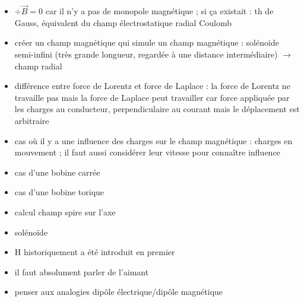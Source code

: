 \begin{remarques} \begin{itemize} 
\item $\div \vec{B} = 0$ car il n'y a pas de monopole magnétique ; si ça existait : th de Gauss, équivalent du champ électrostatique radial Coulomb
\item créer un champ magnétique qui simule un champ magnétique : solénoide semi-infini (très grande longueur, regardée à une distance intermédiaire) $\rightarrow$ champ radial
\item différence entre force de Lorentz et force de Laplace : la force de Lorentz ne travaille pas mais la force de Laplace peut travailler car force appliquée par les charges au conducteur, perpendiculaire au courant mais le déplacement est arbitraire   
\item cas où il y a une influence des charges sur le champ magnétique : charges en mouvement ; il faut aussi considérer leur vitesse pour connaître influence
\item cas d'une bobine carrée
\item cas d'une bobine torique
\item calcul champ spire sur l'axe
\item solénoïde
\item H historiquement a été introduit en premier
\item il faut absolument parler de l'aimant
\item penser aux analogies dipôle électrique/dipôle magnétique
\end{itemize} \end{remarques}